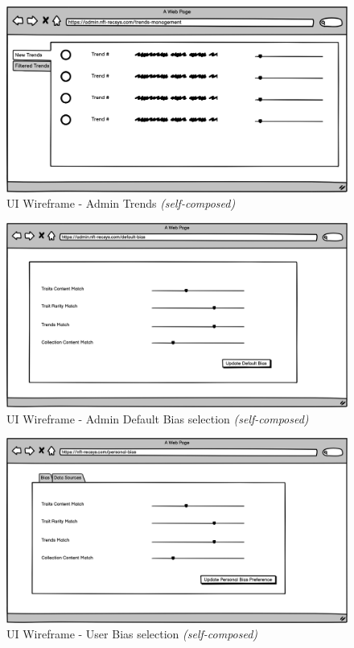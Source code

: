 \begin{figure}[h!]
\centering
\includegraphics[width=\textwidth]{images/appendix/UI Wireframes/Admin Trends.png}
\caption{UI Wireframe - Admin Trends \textit{(self-composed)}}
\end{figure}

\begin{figure}[h!]
\centering
\includegraphics[width=\textwidth]{images/appendix/UI Wireframes/Admin Default Bias selection.png}
\caption{UI Wireframe - Admin Default Bias selection \textit{(self-composed)}}
\end{figure}

\begin{figure}[h!]
\centering
\includegraphics[width=\textwidth]{images/appendix/UI Wireframes/User Bias selection.png}
\caption{UI Wireframe - User Bias selection \textit{(self-composed)}}
\end{figure}


